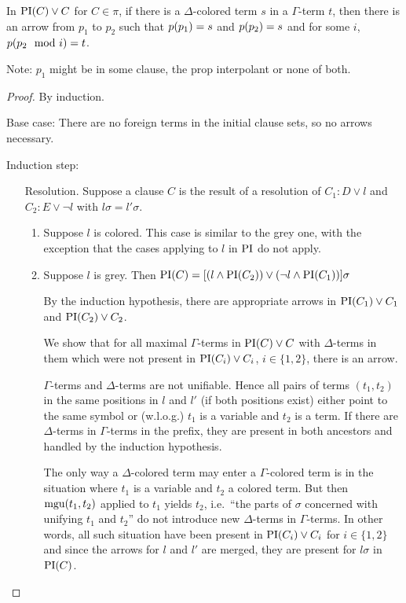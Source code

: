 \documentclass[,%
	paper=a4,%
	DIV14, 
	liststotoc,
	bibtotoc,
	draft=false,%
	numbers=noendperiod
]{scrartcl}
\begin{document}
\begin{lemma}
	In $\operatorname{PI}(C)\lor C$ for $C \in \pi$, if there is a $\Delta$-colored term $s$ in a $\Gamma$-term $t$, then there is an arrow from $p_1$ to $p_2$ such that $p(p_1) = s$ and $p(p_2) = s$ and for some $i$, $p( p_2 \mod i ) = t$.
\end{lemma}
Note: $p_1$ might be in some clause, the prop interpolant or none of both. 
\begin{proof}
	By induction.

	Base case: There are no foreign terms in the initial clause sets, so no arrows necessary.

	Induction step:

	\begin{itemize}
		\item[Resolution.]
			Suppose a clause $C$ is the result of a resolution of $C_1: D \lor l$ and $C_2: E \lor \lnot l$ with $l\sigma = l'\sigma$.

			\begin{enumerate}
				\item Suppose $l$ is colored. 
					This case is similar to the grey one, with the exception that the cases applying to $l$ in $\operatorname{PI}$ do not apply.

				\item Suppose $l$ is grey. Then  $\operatorname{PI}(C) = [(l \land \operatorname{PI}(C_2)) \lor (\lnot l \land \operatorname{PI}(C_1)) ] \sigma $

					By the induction hypothesis, there are appropriate arrows in $\operatorname{PI}(C_1) \lor C_1$ and $\operatorname{PI}(C_2) \lor C_2$.

					We show that for all maximal $\Gamma$-terms in $\operatorname{PI}(C)\lor C$ with $\Delta$-terms in them which were not present in $\operatorname{PI}(C_i)\lor C_i$, $i \in \{1,2\}$, there is an arrow.

					$\Gamma$-terms and $\Delta$-terms are not unifiable.
					Hence all pairs of terms $(t_1, t_2)$ in the same positions in $l$ and $l'$ (if both positions exist) either point to the same symbol or (w.l.o.g.) $t_1$ is a variable and $t_2$ is a term.
					If there are $\Delta$-terms in $\Gamma$-terms in the prefix, they are present in both ancestors and handled by the induction hypothesis.

					The only way a $\Delta$-colored term may enter a $\Gamma$-colored term is in the situation where $t_1$ is a variable and $t_2$ a colored term.
					But then $\operatorname{mgu}(t_1, t_2)$ applied to $t_1$ yields $t_2$, i.e.~``the parts of $\sigma$ concerned with unifying $t_1$ and $t_2$'' do not introduce new $\Delta$-terms in $\Gamma$-terms.
					In other words, all such situation have been present in $\operatorname{PI}(C_i) \lor C_i$ for $i \in \{1,2\}$ and since the arrows for $l$ and $l'$ are merged, they are present for $l\sigma$ in $\operatorname{PI}(C)$.


\end{enumerate}
\end{itemize}
\end{proof}
\end{document}
